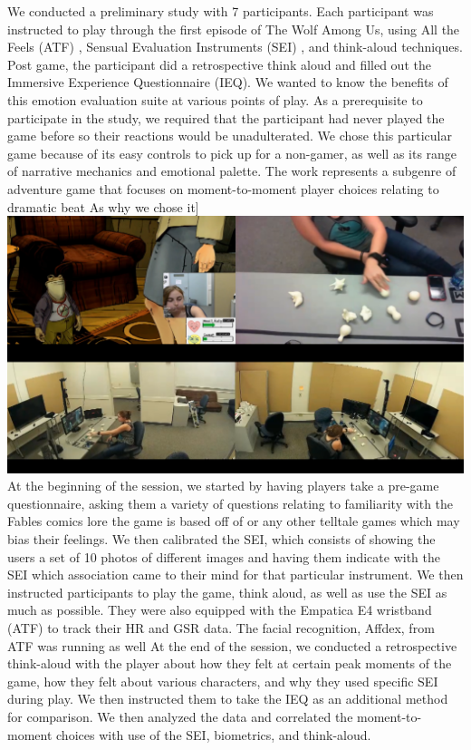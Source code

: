 We conducted a preliminary study with 7 participants. Each participant was instructed to play through the first episode of The Wolf Among Us, using All the Feels (ATF) \cite{Robinson2016-qr}, Sensual Evaluation Instruments (SEI) \cite{Laaksolahti2009-uw,Isbister2006-sc}, and think-aloud techniques. Post game, the participant did a retrospective think aloud and filled out the Immersive Experience Questionnaire (IEQ). We wanted to know the benefits of this emotion evaluation suite at various points of play. As a prerequisite to participate in the study, we required that the participant had never played the game before so their reactions would be unadulterated. We chose this particular game because of its easy controls to pick up for a non-gamer, as well as its range of narrative mechanics and emotional palette. The work represents a subgenre of adventure game that focuses on moment-to-moment player choices relating to dramatic beat \cite{Murray2017-ak} As why we chose it]
\includegraphics[width=.9\linewidth]{Player6ReactionSynced.png}
At the beginning of the session, we started by having players take a
pre-game questionnaire, asking them a variety of questions relating to
familiarity with the Fables comics lore the game is based off of or
any other telltale games which may bias their feelings. We then
calibrated the SEI, which consists of showing the users a set of 10
photos of different images and having them indicate with the SEI which
association came to their mind for that particular instrument.  We
then instructed participants to play the game, think aloud, as well as
use the SEI as much as possible. They were also equipped with the
Empatica E4 wristband (ATF) to track their HR and GSR data. The facial
recognition, Affdex, from ATF was running as well
\cite{Robinson2016-qr} At the end of the session, we conducted a
retrospective think-aloud with the player about how they felt at
certain peak moments of the game, how they felt about various
characters, and why they used specific SEI during play. We then
instructed them to take the IEQ as an additional method for
comparison. We then analyzed the data and correlated the
moment-to-moment choices with use of the SEI, biometrics, and
think-aloud.

